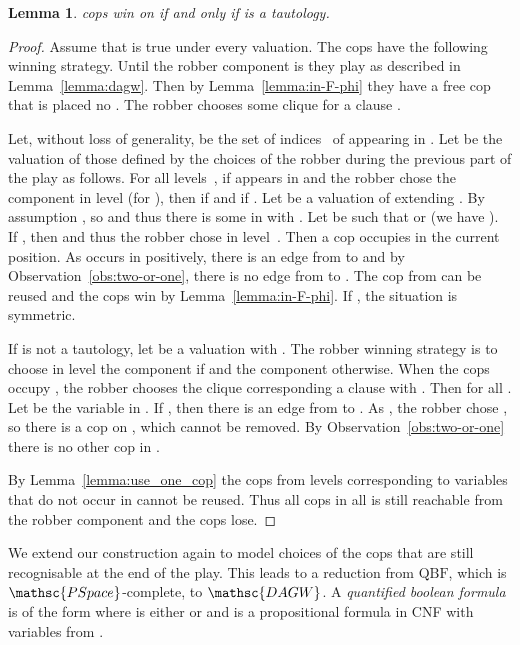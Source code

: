 \documentclass[authoryear]{article}
\newtheorem{lemma}[theorem]{Lemma}
\theoremstyle{definition}
\newcommand{\0}{\emptyset}
\newcommand{\pspace}{\ensuremath{\mathsc{PSpace}}\xspace}
\newcommand{\DAGWprob}{\ensuremath{\mathsc{DAGW}}\xspace}
\newcommand{\QBF}{\ensuremath{\mathrm{QBF}}\xspace}
\begin{document}
\begin{lemma}\label{lemma:tautology}
   cops win on  if and only if  is a tautology.
\end{lemma} 
\begin{proof}
  Assume that  is true under every valuation. The cops have the following
  winning strategy. Until the robber component is  they play as
  described in Lemma~\ref{lemma:dagw}. Then by Lemma~\ref{lemma:in-F-phi} they
  have a free cop that is placed no . The robber chooses some
  clique  for a clause .

  Let, without loss of generality,  be the set
  of indices~ of  appearing in . Let
   be the valuation of those
   defined by the choices of the robber during the previous part
  of the play as follows. For all levels~, if  appears in
   and the robber chose the component  in level  (for
  ), then  if  and
   if . Let  be a valuation of
   extending . By assumption , so
   and thus there is some  in  with .
  Let  be such that  or 
  (we have ). If , then
   and thus the robber chose
   in level~. Then a cop occupies  in the current
  position. As  occurs in  positively, there is an edge from
   to  and by Observation~\ref{obs:two-or-one}, there is no edge
  from  to . The cop from  can be reused and the cops
  win by Lemma~\ref{lemma:in-F-phi}. If , the situation is symmetric.

  If  is not a tautology, let  be a valuation with
  . The robber winning strategy is to choose in level
   the component  if  and the
  component  otherwise. When the cops occupy , the robber chooses
  the clique  corresponding a clause  with
  . Then  for all
  . Let  be the variable in . If
  , then there is an edge from  to . As
  , the robber chose , so there is
  a cop on , which cannot be removed. By
  Observation~\ref{obs:two-or-one} there is no other cop in
  . 

  By Lemma~\ref{lemma:use_one_cop} the cops from levels corresponding to
  variables that do not occur in  cannot be reused. Thus all cops in all
   is still reachable from the robber component and the cops lose.
\end{proof}

We extend our construction again to model choices of the cops that are still
recognisable at the end of the play. This leads to a reduction from \QBF, which
is \pspace-complete, to \DAGWprob. A \emph{quantified boolean formula}  is
of the form  where  is
either  or  and  is a propositional formula in CNF with
variables from .
\end{document}

